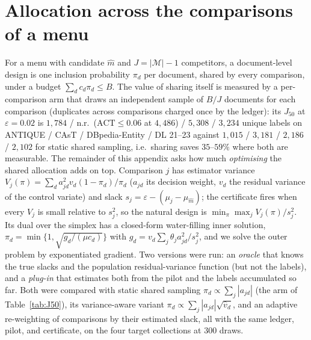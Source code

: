 \documentclass{article}
\newcommand{\eps}{\varepsilon}
\newcommand{\ACT}{\mathrm{ACT}}
\newcommand{\Jfifty}{J_{50}}
\begin{document}
\section{Allocation across the comparisons of a menu}\label{app:menu}
For a menu with candidate $\hat m$ and $J=|\mathcal M|-1$ competitors, a document-level design is one inclusion probability $\pi_d$ per document, shared by every comparison, under a budget $\sum_d c_d\pi_d\le B$. The value of sharing itself is measured by a per-comparison arm that draws an independent sample of $B/J$ documents for each comparison (duplicates across comparisons charged once by the ledger): its $\Jfifty$ at $\eps=0.02$ is $1{,}784$ / n.r.\ ($\ACT\le0.06$ at $4{,}486$) / $5{,}308$ / $3{,}234$ unique labels on ANTIQUE / CAsT / DBpedia-Entity / DL 21--23 against $1{,}015$ / $3{,}181$ / $2{,}186$ / $2{,}102$ for static shared sampling, i.e.\ sharing saves $35$--$59\%$ where both are measurable. The remainder of this appendix asks how much \emph{optimising} the shared allocation adds on top. Comparison $j$ has estimator variance $V_j(\pi)=\sum_d a_{jd}^2 v_d(1-\pi_d)/\pi_d$ ($a_{jd}$ its decision weight, $v_d$ the residual variance of the control variate) and slack $s_j=\eps-(\mu_j-\mu_{\hat m})$; the certificate fires when every $V_j$ is small relative to $s_j^2$, so the natural design is $\min_\pi\max_j V_j(\pi)/s_j^2$. Its dual over the simplex has a closed-form water-filling inner solution, $\pi_d=\min\{1,\sqrt{g_d/(\mu c_d)}\}$ with $g_d=v_d\sum_j\theta_j a_{jd}^2/s_j^2$, and we solve the outer problem by exponentiated gradient. Two versions were run: an \emph{oracle} that knows the true slacks and the population residual-variance function (but not the labels), and a \emph{plug-in} that estimates both from the pilot and the labels accumulated so far. Both were compared with static shared sampling $\pi_d\propto\sum_j|a_{jd}|$ (the arm of Table~\ref{tab:J50}), its variance-aware variant $\pi_d\propto\sum_j|a_{jd}|\sqrt{\hat v_d}$, and an adaptive re-weighting of comparisons by their estimated slack, all with the same ledger, pilot, and certificate, on the four target collections at 300 draws.
\end{document}
